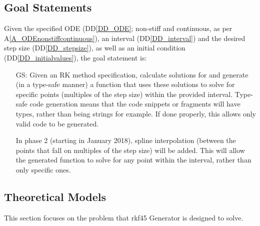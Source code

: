 \documentclass[12pt]{article}
\newcommand{\ddref}[1]{DD\ref{#1}}
\newcommand{\aref}[1]{A\ref{#1}}
\newcounter{goalnum} %
\newcommand{\famname}{rkf45 Generator} %
\begin{document}
\subsection{Goal Statements}

\noindent Given the specified ODE (\ddref{DD_ODE}; non-stiff and continuous, as 
per 
\aref{A_ODEnonstiffcontinuous}), an interval (\ddref{DD_interval}) and the 
desired step 
size (\ddref{DD_stepsize}), as well as 
an initial condition (\ddref{DD_initialvalues}), the goal statement is:

\begin{itemize}

\item[GS\refstepcounter{goalnum}\thegoalnum \label{G_meaningfulLabel}:] Given 
an RK method specification, calculate solutions for and generate (in a 
type-safe manner) a 
function that uses these solutions to solve for specific points (multiples of 
the step size) within the provided 
interval.
Type-safe code generation means that the code snippets or fragments will have 
types, rather than being strings for example. If done properly, this allows 
only valid code to be generated.

In phase 2 (starting in January 2018), spline interpolation (between the points 
that fall on multiples of the step size) will be added. This 
will allow the generated function to solve for any point within the interval, 
rather than only specific ones.
\end{itemize}


\subsection{Theoretical Models} \label{sec_theoretical}

This section focuses on the problem that \famname{} is designed to solve.

~\newline
\end{document}
